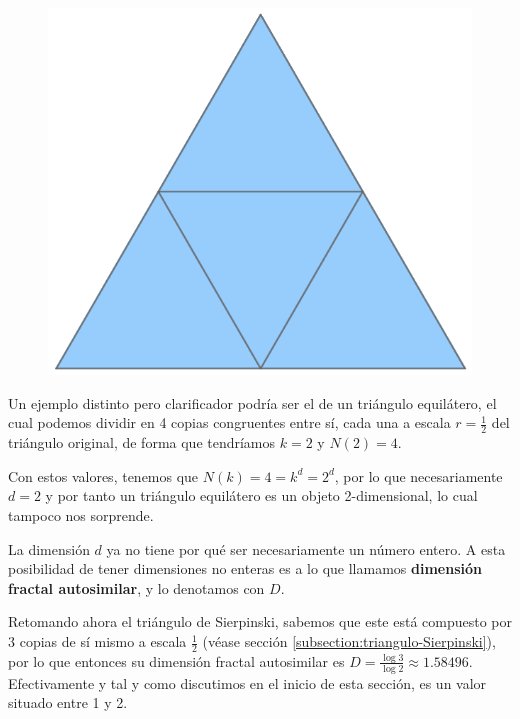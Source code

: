 \begin{figure}
\includegraphics[scale=0.14, trim={0cm 0.35cm 0cm 0.5cm}, clip]{./img/triangulo-dividido.png}
\end{figure}

Un ejemplo distinto pero clarificador podría ser el de un triángulo equilátero, el cual podemos dividir en 4 copias congruentes entre sí, cada una a escala $r=\frac 1 2$ del triángulo original, de forma que tendríamos $k=2$ y $N(2)=4$. 

Con estos valores, tenemos que $N(k)=4=k^d=2^d$, por lo que necesariamente $d=2$ y por tanto un triángulo equilátero es un objeto 2-dimensional, lo cual tampoco nos sorprende.

\begin{observacion}
La dimensión $d$ ya no tiene por qué ser necesariamente un número entero. A esta posibilidad de tener dimensiones no enteras es a lo que llamamos \textbf{dimensión fractal autosimilar}, y lo denotamos con $D$.
\end{observacion}

Retomando ahora el triángulo de Sierpinski, sabemos que este está compuesto por 3 copias de sí mismo a escala $\frac 1 2$ (véase sección \ref{subsection:triangulo-Sierpinski}), por lo que entonces su dimensión fractal autosimilar es $D=\frac{\log 3}{\log 2} \approx 1.58496$. Efectivamente y tal y como discutimos en el inicio de esta sección, es un valor situado entre 1 y 2.

